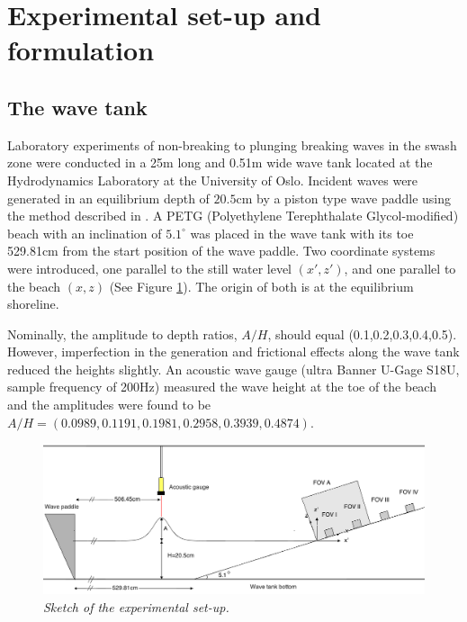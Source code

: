 \documentclass[a4paper, 11pt, english, twoside, openright]{article}
\begin{document}
\section{Experimental set-up and formulation}
\label{experimnetal-set-up}

\subsection{The wave tank}
Laboratory experiments of non-breaking to plunging breaking waves in the swash zone were conducted in  a 25m long and 0.51m wide wave tank 
located at the Hydrodynamics Laboratory at the University of Oslo.
Incident waves were generated in an equilibrium depth of $20.5$cm by
a piston type wave paddle using the method described in 
\cite{jensen2003experimental}. 
A PETG (Polyethylene Terephthalate Glycol-modified) beach with an inclination of $5.1^{\circ}$ was placed in the wave tank with its toe 529.81cm from the start position of the wave paddle.   Two coordinate systems were introduced, one parallel to the still water level $(x',z')$, and one parallel to the beach $(x,z)$ (See Figure \ref{fig:beach_tegning}).  The origin of both is at the equilibrium shoreline.

Nominally, the amplitude to depth ratios, $A/H$, should equal (0.1,0.2,0.3,0.4,0.5).  
However, imperfection in the generation and frictional effects along
the wave tank reduced the heights slightly.  
An acoustic wave gauge (ultra Banner U-Gage S18U, sample frequency of 200Hz) measured the wave height at the toe of the beach and the amplitudes were found to be
  $A/H=(0.0989, 0.1191, 0.1981, 0.2958, 0.3939, 0.4874)$.


\begin{figure}[]
\centering
\includegraphics[width=\textwidth]{./Figures/setup3.png}
\caption{\textit{ Sketch of  the experimental set-up.}}
\label{fig:beach_tegning}
\end{figure}
\end{document}
